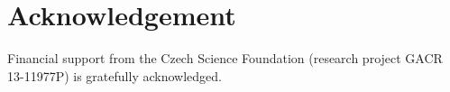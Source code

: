 \documentclass[review]{elsarticle}
\begin{document}
% 
% 
% 
% 

\section{Acknowledgement}

Financial support from the Czech Science Foundation (research project GACR 13-11977P) is gratefully acknowledged.



\end{document}
